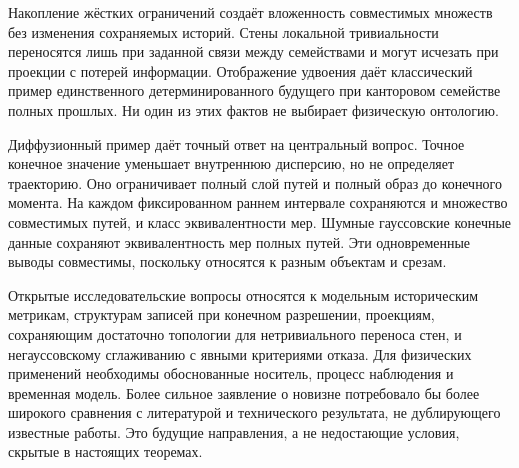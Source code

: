 {Накопление жёстких ограничений создаёт вложенность совместимых множеств без изменения сохраняемых историй. Стены локальной тривиальности переносятся лишь при заданной связи между семействами и могут исчезать при проекции с потерей информации. Отображение удвоения даёт классический пример единственного детерминированного будущего при канторовом семействе полных прошлых. Ни один из этих фактов не выбирает физическую онтологию.}

{Диффузионный пример даёт точный ответ на центральный вопрос. Точное конечное значение уменьшает внутреннюю дисперсию, но не определяет траекторию. Оно ограничивает полный слой путей и полный образ до конечного момента. На каждом фиксированном раннем интервале сохраняются и множество совместимых путей, и класс эквивалентности мер. Шумные гауссовские конечные данные сохраняют эквивалентность мер полных путей. Эти одновременные выводы совместимы, поскольку относятся к разным объектам и срезам.}

{Открытые исследовательские вопросы относятся к модельным историческим метрикам, структурам записей при конечном разрешении, проекциям, сохраняющим достаточно топологии для нетривиального переноса стен, и негауссовскому сглаживанию с явными критериями отказа. Для физических применений необходимы обоснованные носитель, процесс наблюдения и временная модель. Более сильное заявление о новизне потребовало бы более широкого сравнения с литературой и технического результата, не дублирующего известные работы. Это будущие направления, а не недостающие условия, скрытые в настоящих теоремах.}

